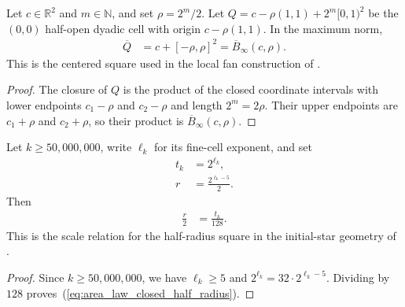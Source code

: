 \begin{lemma}
    \label{thm:area_law_centered_dyadic_cell_ball}
    \leanok
    Let $c\in\mathbb R^2$ and $m\in\mathbb N$, and set $\rho=2^m/2$.
    Let $Q=c-\rho(1,1)+2^m[0,1)^2$ be the $(0,0)$ half-open
    dyadic cell with origin $c-\rho(1,1)$. In the maximum norm,
    \begin{align}
        \overline Q
         & =c+[-\rho,\rho]^2
        =\overline B_\infty(c,\rho).
    \end{align}
    This is the centered square used in the local fan construction of
    \cite[Section~11]{OpenAI2026AreaLaw}.
\end{lemma}
\begin{proof}\leanok
    The closure of $Q$ is the product of the closed coordinate intervals
    with lower endpoints $c_1-\rho$ and $c_2-\rho$ and length $2^m=2\rho$.
    Their upper endpoints are $c_1+\rho$ and $c_2+\rho$, so their product is
    $\overline B_\infty(c,\rho)$.
\end{proof}


\begin{lemma}
    \label{thm:area_law_initial_closed_half_radius}
    \leanok
    Let $k\ge50{,}000{,}000$, write $\ell_k$ for its fine-cell exponent,
    and set
    \begin{align}
        t_k & =2^{\ell_k},           \\
        r   & =\frac{2^{\ell_k-5}}2.
    \end{align}
    Then
    \begin{align}
        \frac r2 & =\frac{t_k}{128}.
        \label{eq:area_law_closed_half_radius}
    \end{align}
    This is the scale relation for the half-radius square in the initial-star
    geometry of \cite[Section~11]{OpenAI2026AreaLaw}.
\end{lemma}
\begin{proof}\leanok
    Since $k\ge50{,}000{,}000$, we have $\ell_k\ge5$ and
    $2^{\ell_k}=32\cdot2^{\ell_k-5}$.
    Dividing by $128$ proves~(\ref{eq:area_law_closed_half_radius}).
\end{proof}

